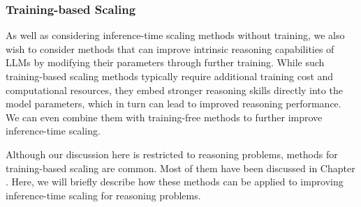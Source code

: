 \subsubsection{Training-based Scaling}

As well as considering inference-time scaling methods without training, we also wish to consider methods that can improve intrinsic reasoning capabilities of LLMs by modifying their parameters through further training. While such training-based scaling methods typically require additional training cost and computational resources, they embed stronger reasoning skills directly into the model parameters, which in turn can lead to improved reasoning performance. We can even combine them with training-free methods to further improve inference-time scaling.

Although our discussion here is restricted to reasoning problems, methods for training-based scaling are common. Most of them have been discussed in Chapter \ChapterLLMTuning. Here, we will briefly describe how these methods can be applied to improving inference-time scaling for reasoning problems.

